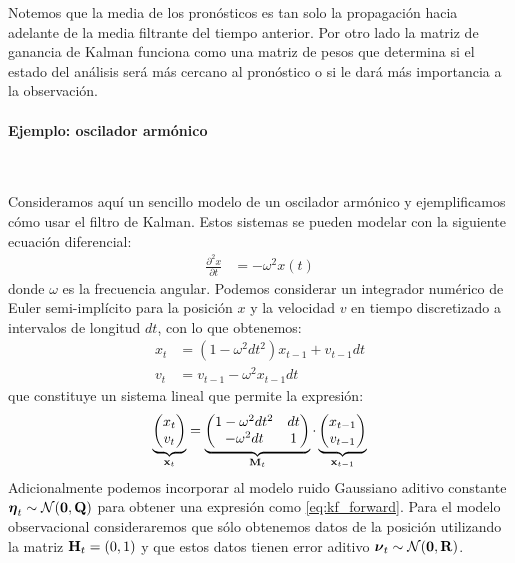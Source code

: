 Notemos que la media de los pronósticos es tan solo la propagación hacia adelante de la media filtrante del tiempo anterior. Por otro lado la matriz de ganancia de Kalman funciona como una matriz de pesos que determina si el estado del análisis será más cercano al pronóstico o si le dará más importancia a la observación. 

\paragraph{Ejemplo: oscilador armónico} \

Consideramos aquí un sencillo modelo de un oscilador armónico y ejemplificamos cómo usar el filtro de Kalman. Estos sistemas se pueden modelar con la siguiente ecuación diferencial:
\begin{align*}
    \frac{\partial^2 x}{\partial t} &= -\omega^2 x(t)
\end{align*}
donde $\omega$ es la frecuencia angular. Podemos considerar un integrador numérico de Euler semi-implícito para la posición $x$ y la velocidad $v$ en tiempo discretizado a intervalos de longitud $dt$, con lo que obtenemos:
\begin{align*}
    x_t &= (1 - \omega^2 dt^2) x_{t-1} + v_{t-1} dt \\
    v_t &= v_{t-1} - \omega^2 x_{t-1} dt
\end{align*}
que constituye un sistema lineal que permite la expresión:
\begin{align*}
\underbrace{\begin{pmatrix*}
        x_t \\
        v_t
    \end{pmatrix*}}_{\v x_t} = 
\underbrace{\begin{pmatrix*}
        1 - \omega^2 dt^2 & dt \\
        -\omega^2 dt & 1
    \end{pmatrix*}}_{\v M_t} \cdot
\underbrace{\begin{pmatrix*}
        x_{t-1} \\
        v_{t-1}
    \end{pmatrix*}}_{\v x_{t-1}}
\end{align*}
Adicionalmente podemos incorporar al modelo ruido Gaussiano aditivo constante $\mbox{\boldmath$ \eta $}_t \sim \mathcal{N}(\mathbf{0}, \mathbf{Q})$ para obtener una expresión como \ref{eq:kf_forward}. Para el modelo observacional consideraremos que sólo obtenemos datos de la posición utilizando la matriz $\mathbf{H}_t = (0, 1)$ y que estos datos tienen error aditivo $\mbox{\boldmath$ \nu $}_t \sim \mathcal{N}(\mathbf{0}, \mathbf{R})$.

